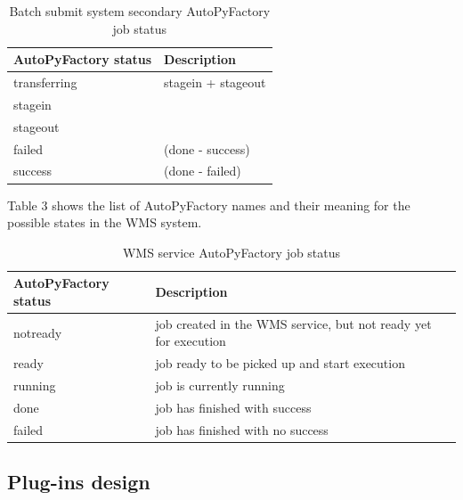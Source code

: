 \documentclass[a4paper]{jpconf}
\begin{document}
\begin{table}[h]
   \begin{center}
      \begin{tabular}{l l}
         \hline
         \textbf{AutoPyFactory status} & \textbf{Description}  \\ 
         \hline
         transferring  &     stagein + stageout  \\ 
         stagein       &                         \\ 
         stageout      &                         \\ 
         failed        &     (done - success)    \\ 
         success       &     (done - failed)     \\ 
         \hline
      \end{tabular}
   \end{center}
   \caption{Batch submit system secondary AutoPyFactory job status} 
   \label{job secondary status}
\end{table}

Table 3 shows the list of AutoPyFactory names and their meaning 
for the possible states in the WMS system.

\begin{table}[h]
   \begin{center}
      \begin{tabular}{l l}
         \hline
         \textbf{AutoPyFactory status} & \textbf{Description} \\
         \hline
         notready &     job created in the WMS service, but not ready yet for execution\\ 
         ready    &     job ready to be picked up and start execution                  \\ 
         running  &     job is currently running                                       \\ 
         done     &     job has finished with success                                  \\ 
         failed   &     job has finished with no success                               \\ 
         \hline
      \end{tabular}
   \end{center}
   \caption{WMS service AutoPyFactory job status}
   \label{wms job status}
\end{table}

\subsection{Plug-ins design}
\end{document}
